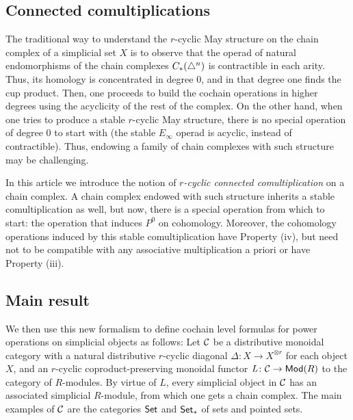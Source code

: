 \subsection{Connected comultiplications} The traditional way to understand the $r$-cyclic May structure on the chain complex of a simplicial set $X$ is to observe that the operad of natural endomorphisms of the chain complexes $C_{*}(\triangle^n)$ is contractible in each arity. Thus, its homology is concentrated in degree $0$, and in that degree one finds the cup product. Then, one proceeds to build the cochain operations in higher degrees using the acyclicity of the rest of the complex. On the other hand, when one tries to produce a stable $r$-cyclic May structure, there is no special operation of degree $0$ to start with (the stable $E_{\infty}$ operad is acyclic, instead of contractible). Thus, endowing a family of chain complexes with such structure may be challenging.

In this article we introduce the notion of \emph{$r$-cyclic connected comultiplication} on a chain complex. A chain complex endowed with such structure inherits a stable comultiplication as well, but now, there is a special operation from which to start: the operation that induces $P^0$ on cohomology. Moreover, the cohomology operations induced by this stable comultiplication have Property (iv), but need not to be compatible with any associative multiplication a priori or have Property (iii). %


\subsection{Main result} We then use this new formalism to define cochain level formulas for power operations on simplicial objects as follows: Let $\mathcal{C}$ be a distributive monoidal category with a natural distributive $r$-cyclic diagonal $\Delta\colon X\to X^{\otimes r}$ for each object $X$, and an $r$-cyclic coproduct-preserving monoidal functor $\operatorname{{\it L}}\colon \mathcal{C}\to \mathsf{Mod}(R)$ to the category of $R$-modules. By virtue of $L$, every simplicial object in $\mathcal{C}$ has an associated simplicial $R$-module, from which one gets a chain complex. The main examples of $\mathcal{C}$ are the categories $\mathsf{Set}$ and $\mathsf{Set}_*$ of sets and pointed sets.

